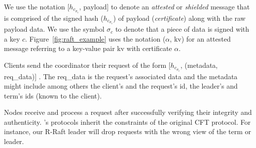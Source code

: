 We use the notation [$h_{c_{\sigma_c}}$, payload] to denote an \emph{attested} or \emph{shielded}  message that is comprised of the signed hash ($h_{c_{\sigma_c}}$) of payload (\emph{certificate}) along with the raw payload data. We use the symbol $\sigma_{c}$ to denote that a piece of data is signed with a key $c$. Figure~\ref{fig:raft_example} uses the notation ($\alpha$, {kv}) for an attested message referring to a key-value pair kv with certificate $\alpha$.




     Clients send the coordinator their request of the form [$h_{c_{\sigma_c}}$, (metadata, req\_data)] . The req\_data is the request's associated data and the metadata might include among others the client's and the request's id, the leader's and term's ids (known to the client). %
    
    
     Nodes receive and process a request after successfully verifying their integrity and authenticity. \projecttitle{}'s protocols inherit the constraints of the original CFT protocol. For instance, our R-Raft leader will drop requests with the wrong view of the term or leader.
    
